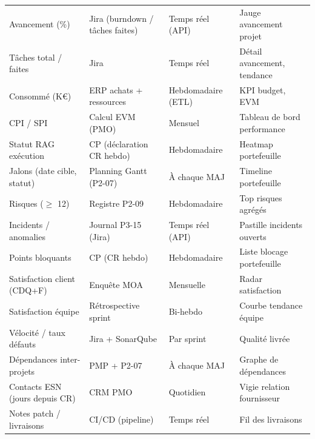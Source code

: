 \documentclass[11pt,a4paper,oneside]{report}
\begin{document}
\renewcommand{\arraystretch}{1.3}
\begin{tabularx}{\textwidth}{L{4cm} L{3.5cm} C{2.2cm} Y}
\toprule
{} &  &  &  \\
\midrule
Avancement (\%)                    & Jira (burndown / tâches faites) & Temps réel (API) & Jauge avancement projet \\
Tâches total / faites              & Jira                         & Temps réel       & Détail avancement, tendance \\
Consommé (K€)                      & ERP achats + ressources       & Hebdomadaire (ETL) & KPI budget, EVM \\
CPI / SPI                          & Calcul EVM (PMO)              & Mensuel          & Tableau de bord performance \\
Statut RAG exécution               & CP (déclaration CR hebdo)     & Hebdomadaire     & Heatmap portefeuille \\
Jalons (date cible, statut)        & Planning Gantt (P2-07)        & À chaque MAJ     & Timeline portefeuille \\
Risques ($\geq$ 12)                & Registre P2-09                & Hebdomadaire     & Top risques agrégés \\
Incidents / anomalies              & Journal P3-15 (Jira)          & Temps réel (API) & Pastille incidents ouverts \\
Points bloquants                   & CP (CR hebdo)                 & Hebdomadaire     & Liste blocage portefeuille \\
Satisfaction client (CDQ+F)        & Enquête MOA                   & Mensuelle        & Radar satisfaction \\
Satisfaction équipe                & Rétrospective sprint          & Bi-hebdo         & Courbe tendance équipe \\
Vélocité / taux défauts            & Jira + SonarQube              & Par sprint       & Qualité livrée \\
Dépendances inter-projets          & PMP + P2-07                   & À chaque MAJ     & Graphe de dépendances \\
Contacts ESN (jours depuis CR)     & CRM PMO                       & Quotidien        & Vigie relation fournisseur \\
Notes patch / livraisons           & CI/CD (pipeline)              & Temps réel       & Fil des livraisons \\
\bottomrule
\end{tabularx}
\end{document}

